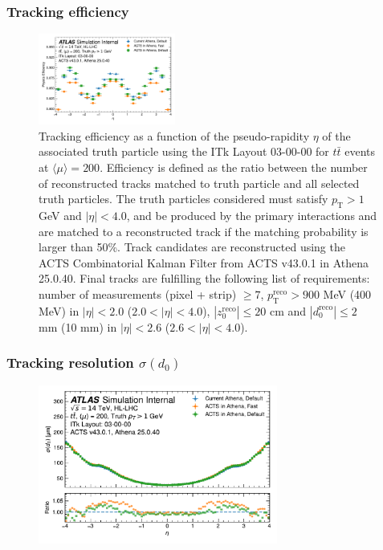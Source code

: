 \documentclass[aspectratio=169]{beamer}
\begin{document}

\begin{frame}
\frametitle{Tracking efficiency}
\begin{figure}[h]
    \centering
    \includegraphics[width=0.4\textwidth]{plots/tracking_efficiency_physics.pdf}
    \caption{Tracking efficiency as a function of the pseudo-rapidity $\eta$ of the associated truth particle using the ITk Layout 03-00-00 for $t\bar{t}$ events at $\langle \mu \rangle = 200$. Efficiency is defined as the ratio between the number of reconstructed tracks matched to truth particle and all selected truth particles. The truth particles considered must satisfy $p_\mathrm{T} > 1$ GeV and $|\eta| < 4.0$, and be produced by the primary interactions and are matched to a reconstructed track if the matching probability is larger than 50\%. Track candidates are reconstructed using the ACTS Combinatorial Kalman Filter from ACTS v43.0.1 in Athena 25.0.40. Final tracks are fulfilling the following list of requirements: number of measurements (pixel + strip) $\geq 7$, $p_\mathrm{T}^\mathrm{reco} > 900$ MeV (400 MeV) in $|\eta| < 2.0$ ($2.0 < |\eta| < 4.0$), $|z_0^\mathrm{reco}| \leq 20$ cm and $|d_0^\mathrm{reco}| \leq 2$ mm (10 mm) in $|\eta| < 2.6$ ($2.6 < |\eta| < 4.0$).}
\end{figure}
\end{frame}

\begin{frame}
\frametitle{Tracking resolution $\sigma(d_0)$}
\begin{figure}[h]
    \centering
    \includegraphics[width=0.7\textwidth]{plots/tracking_resolution_d0.pdf}
    \caption{}
\end{figure}
\end{frame}
\end{document}

